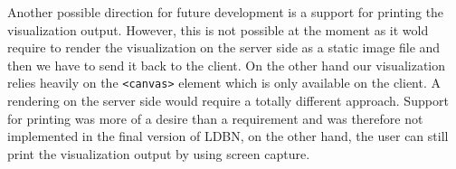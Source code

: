 Another possible direction for future development is a support for printing the visualization output.
However, this is not possible at the moment as it wold require to render the visualization on the server side as
a static image file and then we have to send it back to the client. 
On the other hand our visualization relies heavily on
the \verb=<canvas>= element which is only available on the client. A rendering on the server side would
require a totally different approach. Support for printing was more of a desire than a requirement and
was therefore not implemented in the final version of LDBN, 
on the other hand, the user can still print the visualization output
by using screen capture.

